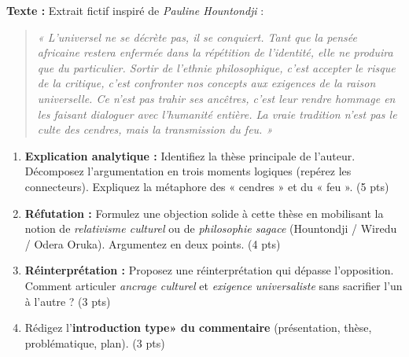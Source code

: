 \documentclass[11pt]{article}
\begin{document}
\begin{exercice}
\textbf{Texte :} Extrait fictif inspiré de \textit{Pauline Hountondji} : 
\begin{quote}
\textit{« L'universel ne se décrète pas, il se conquiert. Tant que la pensée africaine restera enfermée dans la répétition de l'identité, elle ne produira que du particulier. Sortir de l'ethnie philosophique, c'est accepter le risque de la critique, c'est confronter nos concepts aux exigences de la raison universelle. Ce n'est pas trahir ses ancêtres, c'est leur rendre hommage en les faisant dialoguer avec l'humanité entière. La vraie tradition n'est pas le culte des cendres, mais la transmission du feu. »}
\end{quote}
\begin{enumerate}
    \item \textbf{Explication analytique :} Identifiez la thèse principale de l'auteur. Décomposez l'argumentation en trois moments logiques (repérez les connecteurs). Expliquez la métaphore des « cendres » et du « feu ». \hfill (5 pts)
    \item \textbf{Réfutation :} Formulez une objection solide à cette thèse en mobilisant la notion de \textit{relativisme culturel} ou de \textit{philosophie sagace} (Hountondji / Wiredu / Odera Oruka). Argumentez en deux points. \hfill (4 pts)
    \item \textbf{Réinterprétation :} Proposez une réinterprétation qui dépasse l'opposition. Comment articuler \textit{ancrage culturel} et \textit{exigence universaliste} sans sacrifier l'un à l'autre ? \hfill (3 pts)
    \item Rédigez l'\textbf{introduction type» du commentaire} (présentation, thèse, problématique, plan). \hfill (3 pts)
\end{enumerate}
\end{exercice}
\end{document}
